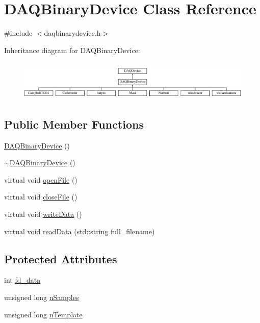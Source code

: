 \hypertarget{classDAQBinaryDevice}{\section{D\-A\-Q\-Binary\-Device Class Reference}
\label{classDAQBinaryDevice}
}


{\ttfamily \#include $<$daqbinarydevice.\-h$>$}

Inheritance diagram for D\-A\-Q\-Binary\-Device\-:\begin{figure}[H]
\begin{center}
\leavevmode
\includegraphics[height=1.920000cm]{classDAQBinaryDevice}
\end{center}
\end{figure}
\subsection*{Public Member Functions}
\begin{DoxyCompactItemize}
\item 
\hyperlink{classDAQBinaryDevice_ae8ebc9eec03d956924919ea8f91e5c56}{D\-A\-Q\-Binary\-Device} ()
\item 
\hyperlink{classDAQBinaryDevice_ad1a003d250a8fcaeec487c23fb70c479}{$\sim$\-D\-A\-Q\-Binary\-Device} ()
\item 
virtual void \hyperlink{classDAQBinaryDevice_a0169d5bde4e7841350a22793522f0529}{open\-File} ()
\item 
virtual void \hyperlink{classDAQBinaryDevice_aaa2ed58aa73772cd742d3239e21944d9}{close\-File} ()
\item 
virtual void \hyperlink{classDAQBinaryDevice_aa438886ea601984abdf2daf0f4e72543}{write\-Data} ()
\item 
virtual void \hyperlink{classDAQBinaryDevice_a725281822b7945b8c1154d079c0011ff}{read\-Data} (std\-::string full\-\_\-filename)
\end{DoxyCompactItemize}
\subsection*{Protected Attributes}
\begin{DoxyCompactItemize}
\item 
int \hyperlink{classDAQBinaryDevice_a561f25e67b72d217b904a104175f0bfd}{fd\-\_\-data}
\item 
unsigned long \hyperlink{classDAQBinaryDevice_a8eac27c83c30772d1260fda3acbde4be}{n\-Samples}
\item 
unsigned long \hyperlink{classDAQBinaryDevice_a50f33c0714edaf6468affc7200229978}{n\-Template}
\end{DoxyCompactItemize}
